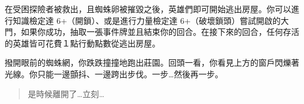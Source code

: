在受困探險者被救出，且蜘蛛卵被摧毀之後，英雄們即可開始逃出房屋。你可以進行知識檢定達 6+（開鎖）、或是進行力量檢定達 6+（破壞鎖頭）嘗試開啟的大門，如果你成功，抽取一張事件牌並且結束你的回合。在接下來的回合，任何存活的英雄皆可花費１點行動點數從逃出房屋。

\begin{HauntStory}
	撥開眼前的蜘蛛網，你跌跌撞撞地跑出莊園。回頭一看，你看見上方的窗戶閃爍著光線。你只能一邊顫抖、一邊跨出步伐。一步…然後再一步。

	\begin{quote}
		是時候離開了…立刻…
	\end{quote}
\end{HauntStory}
